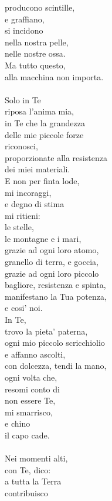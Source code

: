 \begin{haiku}
producono scintille,\\
e graffiano, \\
si incidono\\
nella nostra pelle,\\
nelle nostre ossa.\\
Ma tutto questo,\\
alla macchina non importa.\\
\leavevmode\\
Solo in Te\\
riposa l'anima mia,\\
in Te che la grandezza\\
delle mie piccole forze\\
riconosci,\\
proporzionate alla resistenza\\
dei miei materiali.\\
E non per finta lode,\\
mi incoraggi,\\
e degno di stima\\
mi ritieni:\\
le stelle, \\
le montagne e i mari,\\
grazie ad ogni loro atomo,\\
granello di terra, e goccia,\\
grazie ad ogni loro piccolo\\
bagliore, resistenza e spinta,\\
manifestano la Tua potenza,\\
e cosi' noi.\\
In Te,\\
trovo la pieta' paterna,\\
ogni mio piccolo scricchiolio\\
e affanno ascolti,\\
con dolcezza, tendi la mano,\\
ogni volta che,\\
resomi conto di \\
non essere Te,\\
mi smarrisco,\\
e chino\\
il capo cade.\\
\leavevmode\\
Nei momenti alti,\\
con Te, dico:\\
a tutta la Terra\\
contribuisco\\

\end{haiku}
